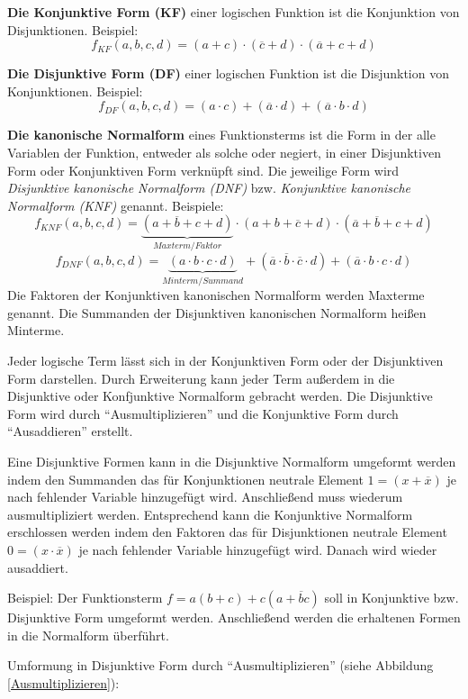 \documentclass[11pt,a4paper]{scrreprt}
\begin{document}
\textbf{Die Konjunktive Form (KF)} einer logischen Funktion ist die Konjunktion von Disjunktionen. Beispiel:
$$ f_{\textit{KF}}(a,b,c,d) = (a + c) \cdot (\overline{c} + d)
	\cdot (\overline{a} + c + d) $$

\textbf{Die Disjunktive Form (DF)} einer logischen Funktion ist die Disjunktion von Konjunktionen. Beispiel:
$$ f_{\textit{DF}}(a,b,c,d) = (a \cdot c) + (\overline{a} \cdot d)
	+ (\overline{a} \cdot b \cdot d) $$

\textbf{Die kanonische Normalform} eines Funktionsterms ist die Form in der alle Variablen der Funktion, entweder als solche oder negiert, in einer Disjunktiven Form oder Konjunktiven Form verknüpft sind. Die jeweilige Form wird \textsl{Disjunktive kanonische Normalform (DNF)} bzw. \textsl{Konjunktive kanonische Normalform (KNF)} genannt. Beispiele:
$$ f_{\textit{KNF}}(a,b,c,d) = 
	\underbrace{(a + \overline{b} + c + d)}_{Maxterm / Faktor}
	\cdot (a + b +\overline{c} + d) 
	\cdot (\overline{a} + \overline{b} + c + d) $$
$$ f_{\textit{DNF}}(a,b,c,d) = 
	\underbrace{(a \cdot b \cdot c \cdot d)}_{Minterm / Summand}
	+ (\overline{a} \cdot \overline{b} \cdot \overline{c} \cdot d)
	+ (\overline{a} \cdot b \cdot c \cdot d) $$
Die Faktoren der Konjunktiven kanonischen Normalform werden Maxterme genannt. Die Summanden der Disjunktiven kanonischen Normalform heißen Minterme.

Jeder logische Term lässt sich in der Konjunktiven Form oder der Disjunktiven Form darstellen. Durch Erweiterung kann jeder Term außerdem in die Disjunktive oder Konfjunktive Normalform gebracht werden. Die Disjunktive Form wird durch "`Ausmultiplizieren"' und die Konjunktive Form durch "`Ausaddieren"' erstellt.

Eine Disjunktive Formen kann in die Disjunktive Normalform umgeformt werden indem den Summanden das für Konjunktionen neutrale Element $1 = (x + \overline{x})$ je nach fehlender Variable hinzugefügt wird. Anschließend muss wiederum ausmultipliziert werden. Entsprechend kann die Konjunktive Normalform erschlossen werden indem den Faktoren das für Disjunktionen neutrale Element $0 = (x \cdot \overline{x})$ je nach fehlender Variable hinzugefügt wird. Danach wird wieder ausaddiert.

Beispiel: Der Funktionsterm $f = a(b + c) + c(a + \overline{b}c)$ soll in Konjunktive bzw. Disjunktive Form umgeformt werden. Anschließend werden die erhaltenen Formen in die Normalform überführt.

Umformung in Disjunktive Form durch "`Ausmultiplizieren"' (siehe Abbildung \ref{Ausmultiplizieren}):
\end{document}
